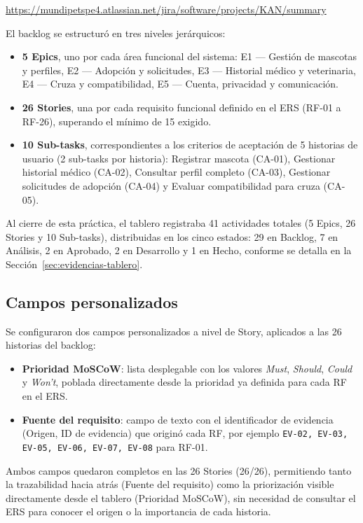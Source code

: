 \documentclass[journal,onecolumn]{IEEEtran}
\begin{document}
	\url{https://mundipetspe4.atlassian.net/jira/software/projects/KAN/summary}
	
	El backlog se estructuró en tres niveles jerárquicos:
	
	\begin{itemize}
		\item \textbf{5 Epics}, uno por cada área funcional del sistema: E1 --- Gestión de mascotas y perfiles, E2 --- Adopción y solicitudes, E3 --- Historial médico y veterinaria, E4 --- Cruza y compatibilidad, E5 --- Cuenta, privacidad y comunicación.
		\item \textbf{26 Stories}, una por cada requisito funcional definido en el ERS (RF-01 a RF-26), superando el mínimo de 15 exigido.
		\item \textbf{10 Sub-tasks}, correspondientes a los criterios de aceptación de 5 historias de usuario (2 sub-tasks por historia): Registrar mascota (CA-01), Gestionar historial médico (CA-02), Consultar perfil completo (CA-03), Gestionar solicitudes de adopción (CA-04) y Evaluar compatibilidad para cruza (CA-05).
	\end{itemize}
	
	Al cierre de esta práctica, el tablero registraba 41 actividades totales (5 Epics, 26 Stories y 10 Sub-tasks), distribuidas en los cinco estados: 29 en Backlog, 7 en Análisis, 2 en Aprobado, 2 en Desarrollo y 1 en Hecho, conforme se detalla en la Sección~\ref{sec:evidencias-tablero}.
	
	\subsection{Campos personalizados}
	
	Se configuraron dos campos personalizados a nivel de Story, aplicados a las 26 historias del backlog:
	
	\begin{itemize}
		\item \textbf{Prioridad MoSCoW}: lista desplegable con los valores \textit{Must}, \textit{Should}, \textit{Could} y \textit{Won't}, poblada directamente desde la prioridad ya definida para cada RF en el ERS.
		\item \textbf{Fuente del requisito}: campo de texto con el identificador de evidencia (Origen, ID de evidencia) que originó cada RF, por ejemplo \texttt{EV-02, EV-03, EV-05, EV-06, EV-07, EV-08} para RF-01.
	\end{itemize}
	
	Ambos campos quedaron completos en las 26 Stories (26/26), permitiendo tanto la trazabilidad hacia atrás (Fuente del requisito) como la priorización visible directamente desde el tablero (Prioridad MoSCoW), sin necesidad de consultar el ERS para conocer el origen o la importancia de cada historia.
	
\end{document}
